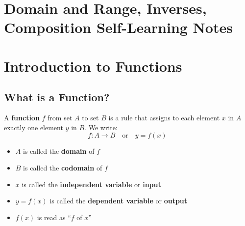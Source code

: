 \documentclass[12pt,a4paper]{article}
\begin{document}
\section*{ Domain and Range, Inverses, Composition Self-Learning Notes}


\section{Introduction to Functions}

\subsection{What is a Function?}

\begin{definition}
A \textbf{function} $f$ from set $A$ to set $B$ is a rule that assigns to each element $x$ in $A$ exactly one element $y$ in $B$. We write:
\[
f: A \to B \quad \text{or} \quad y = f(x)
\]

\begin{itemize}
    \item $A$ is called the \textbf{domain} of $f$
    \item $B$ is called the \textbf{codomain} of $f$
    \item $x$ is called the \textbf{independent variable} or \textbf{input}
    \item $y = f(x)$ is called the \textbf{dependent variable} or \textbf{output}
    \item $f(x)$ is read as ``$f$ of $x$''
\end{itemize}
\end{definition}

\begin{center}
\end{center}
\end{document}
